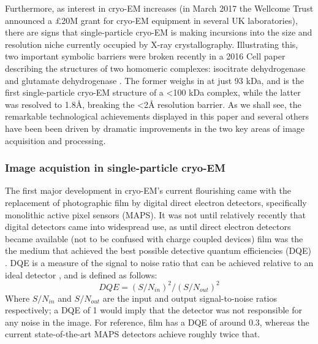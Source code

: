 \documentclass[a4paper,11pt,twoside,openright]{scrbook}
\begin{document}
Furthermore, as interest in cryo-EM increases (in March 2017 the Wellcome Trust announced a £20M grant for cryo-EM equipment in several UK laboratories), there are signs that single-particle cryo-EM is making incursions into the size and resolution niche currently occupied by X-ray crystallography. Illustrating this, two important symbolic barriers were broken recently in a 2016 Cell paper describing the structures of two homomeric complexes: isocitrate dehydrogenase and glutamate dehydrogenase \cite{Merk2016}. The former weighs in at just 93 kDa, and is the first single-particle cryo-EM structure of a <100 kDa complex, while the latter was resolved to 1.8Å, breaking the <2Å resolution barrier. As we shall see, the remarkable technological achievements displayed in this paper and several others have been been driven by dramatic improvements in the two key areas of image acquisition and processing\cite{Bai2015}.

\subsubsection{Image acquistion in single-particle cryo-EM}
The first major development in cryo-EM's current flourishing came with the replacement of photographic film by digital direct electron detectors, specifically monolithic active pixel sensors (MAPS). It was not until relatively recently that digital detectors came into widespread use, as until direct electron detectors became available (not to be confused with charge coupled devices) film was the the medium that achieved the best possible detective quantum efficiencies (DQE) \cite{McMullan2009}. DQE is a measure of the signal to noise ratio that can be achieved relative to an ideal detector \cite{Dainty1975}, and is defined as follows:
\begin{displaymath}
    DQE = (S/N_{in})^{2}/(S/N_{out})^{2}
\end{displaymath}
Where \begin{math} S/N_{in} \end{math} and \begin{math} S/N_{out} \end{math} are the input and output signal-to-noise ratios respectively; a DQE of 1 would imply that the detector was not responsible for any noise in the image. For reference, film has a DQE of around 0.3, whereas the current state-of-the-art MAPS detectors achieve roughly twice that.
\end{document}
